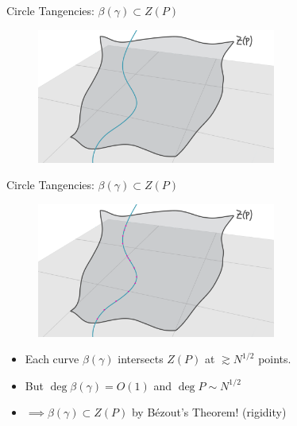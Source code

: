 \documentclass{beamer}
\newcommand{\nfr}[1]{\begin{frame} #1
\end{frame}}
\begin{document}
\nfr{{Circle Tangencies: $\beta(\gamma) \subset Z(P)$}
\begin{figure}[h]
    \centering
    \includegraphics[width=0.7\textwidth]{images/lots_of_dots_e.png}
\end{figure}
}

\nfr{{Circle Tangencies: $\beta(\gamma) \subset Z(P)$}
\begin{figure}[h]
    \centering
    \includegraphics[width=0.7\textwidth]{images/lots_of_dots_f.png}
\end{figure}
\begin{itemize}
    \item Each curve $\beta(\gamma)$ intersects $Z(P)$ at $\gtrsim N^{1/2}$ points. \pause
    \item But $\deg \beta(\gamma) = O (1)$ and $\deg P \sim N^{1/2}$ \pause
    \item $\implies \beta(\gamma) \subset Z(P)$ by Bézout's Theorem! (rigidity)
\end{itemize}
}
\end{document}
